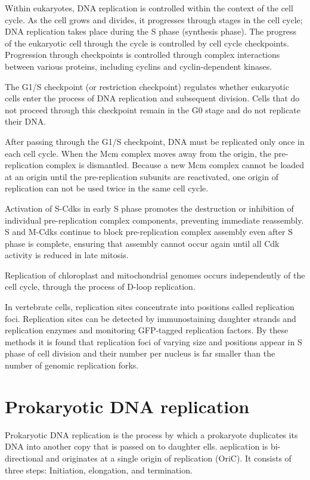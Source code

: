 Within eukaryotes, DNA replication is controlled within the context of the cell cycle. As the cell grows and divides, it progresses through stages in the cell cycle; DNA replication takes place during the S phase (synthesis phase). The progress of the eukaryotic cell through the cycle is controlled by cell cycle checkpoints. Progression through checkpoints is controlled through complex interactions between various proteins, including cyclins and cyclin-dependent kinases.

The G1/S checkpoint (or restriction checkpoint) regulates whether eukaryotic cells enter the process of DNA replication and subsequent division. Cells that do not proceed through this checkpoint remain in the G0 stage and do not replicate their DNA.

After passing through the G1/S checkpoint, DNA must be replicated only once in each cell cycle. When the Mcm complex moves away from the origin, the pre-replication complex is dismantled. Because a new Mcm complex cannot be loaded at an origin until the pre-replication subunits are reactivated, one origin of replication can not be used twice in the same cell cycle.

Activation of S-Cdks in early S phase promotes the destruction or inhibition of individual pre-replication complex components, preventing immediate reassembly. S and M-Cdks continue to block pre-replication complex assembly even after S phase is complete, ensuring that assembly cannot occur again until all Cdk activity is reduced in late mitosis.

Replication of chloroplast and mitochondrial genomes occurs independently of the cell cycle, through the process of D-loop replication.

In vertebrate cells, replication sites concentrate into positions called replication foci. Replication sites can be detected by immunostaining daughter strands and replication enzymes and monitoring GFP-tagged replication factors. By these methods it is found that replication foci of varying size and positions appear in S phase of cell division and their number per nucleus is far smaller than the number of genomic replication forks.

\hypertarget{prokaryotic-dna-replication}{%
\section{Prokaryotic DNA replication}\label{prokaryotic-dna-replication}}

Prokaryotic DNA replication is the process by which a prokaryote duplicates its DNA into another copy that is passed on to daughter ells. aeplication is bi-directional and originates at a single origin of replication (OriC). It consists of three steps: Initiation, elongation, and termination.

